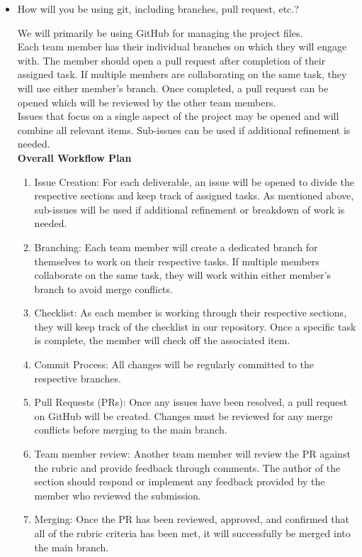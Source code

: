 \documentclass{article}
\begin{document}
\begin{itemize}
	\item How will you be using git, including branches, pull request, etc.?

  We will primarily be using GitHub for managing the project files. \\
Each team member has their individual branches on which they will engage with. 
The member should open a pull request after completion of their assigned task. If 
multiple members are collaborating on the same task, they will use either member's branch. Once completed, 
a pull request can be opened which will be reviewed by the other team members. \\

Issues that focus on a single aspect of the project may be opened and will combine
all relevant items. Sub-issues can be used if additional refinement is needed. \\

\textbf{Overall Workflow Plan}
\begin{enumerate}
 \item Issue Creation: For each deliverable, an issue will be opened to divide the respective sections and keep track of assigned tasks.
 As mentioned above, sub-issues will be used if additional refinement or breakdown of work is needed.
 \item Branching: Each team member will create a dedicated branch for themselves to work on their respective tasks. If multiple members
 collaborate on the same task, they will work within either member’s branch to avoid merge conflicts.
 \item Checklist: As each member is working through their respective sections, they will keep track of the checklist in our repository.
 Once a specific task is complete, the member will check off the associated item.
 \item Commit Process: All changes will be regularly committed to the respective branches.
 \item Pull Requests (PRs): Once any issues have been resolved, a pull request on GitHub will be created. Changes must be reviewed for
 any merge conflicts before merging to the main branch.
 \item Team member review: Another team member will review the PR against the rubric and provide feedback through comments. The author
 of the section should respond or implement any feedback provided by the member who reviewed the submission.
 \item Merging: Once the PR has been reviewed, approved, and confirmed that all of the rubric criteria has been met, it will successfully
 be merged into the main branch.
\end{enumerate}





\end{itemize}
\end{document}
